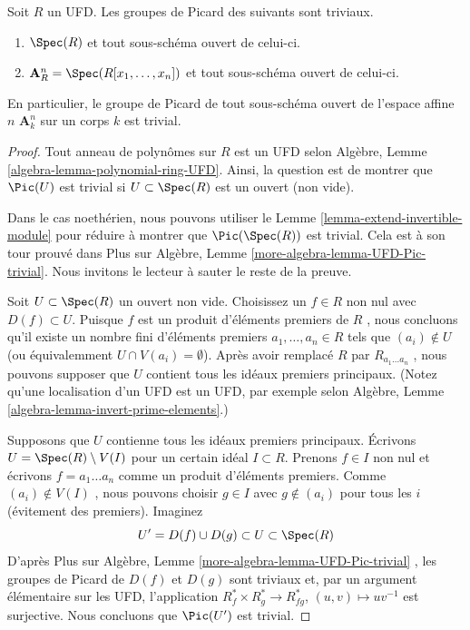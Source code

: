 \begin{lemma}
\label{lemma-open-subscheme-UFD}
Soit  $R$  un UFD. Les groupes de Picard des suivants sont triviaux.
\begin{enumerate}
\item $\Spec(R)$  et tout sous-schéma ouvert de celui-ci.
\item $\mathbf{A}^n_R = \Spec(R[x_1, \ldots, x_n])$  et tout sous-schéma ouvert de celui-ci.
\end{enumerate}
En particulier, le groupe de Picard de tout sous-schéma ouvert de l'espace affine
 $n$  $\mathbf{A}^n_k$  sur un corps  $k$  est trivial.
\end{lemma}

\begin{proof}
Tout anneau de polynômes sur  $R$  est un UFD selon Algèbre, Lemme
 \ref{algebra-lemma-polynomial-ring-UFD}. Ainsi, la question est de montrer que  $\Pic(U)$  est trivial si
 $U \subset \Spec(R)$  est un ouvert (non vide).

\medskip\noindent
Dans le cas noethérien, nous pouvons utiliser le Lemme  \ref{lemma-extend-invertible-module}  pour réduire à
montrer que  $\Pic(\Spec(R))$  est trivial. Cela est à son tour prouvé dans Plus sur
Algèbre, Lemme  \ref{more-algebra-lemma-UFD-Pic-trivial}. Nous invitons le lecteur à sauter le reste de la
preuve.

\medskip\noindent
Soit  $U \subset \Spec(R)$  un ouvert non vide. Choisissez un  $f \in R$  non nul avec
 $D(f) \subset U$. Puisque  $f$  est un produit d'éléments premiers de
 $R$ , nous concluons qu'il existe un nombre fini d'éléments premiers
 $a_1, \ldots, a_n \in R$  tels que  $(a_i) \not \in U$  (ou équivalemment  $U \cap V(a_i) = \emptyset$). Après avoir
remplacé  $R$  par  $R_{a_1 \ldots a_n}$ , nous pouvons supposer que  $U$ 
contient tous les idéaux premiers principaux. (Notez qu'une localisation d'un UFD
est un UFD, par exemple selon Algèbre, Lemme  \ref{algebra-lemma-invert-prime-elements}.)

\medskip\noindent
Supposons que  $U$  contienne tous les idéaux premiers principaux. Écrivons
 $U = \Spec(R) \setminus V(I)$  pour un certain idéal  $I \subset R$. Prenons  $f \in I$  non nul et
écrivons  $f = a_1 \ldots a_n$  comme un produit d’éléments premiers. Comme  $(a_i) \not \in V(I)$ ,
nous pouvons choisir  $g \in I$  avec  $g \not \in (a_i)$  pour tous les  $i$ 
(évitement des premiers). Imaginez
$$
U' = D(f) \cup D(g) \subset U \subset \Spec(R)
$$
D'après Plus sur Algèbre, Lemme  \ref{more-algebra-lemma-UFD-Pic-trivial} , les groupes de Picard de
 $D(f)$  et  $D(g)$  sont triviaux et, par un argument élémentaire sur les
UFD, l'application  $R_f^* \times R_g^* \to R_{fg}^*$,  $(u, v) \mapsto uv^{-1}$  est surjective. Nous concluons que
 $\Pic(U')$  est trivial.


\end{proof}
